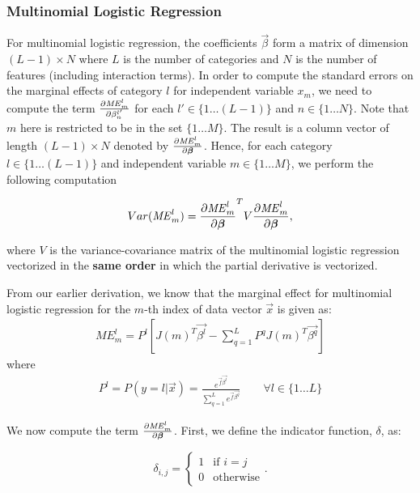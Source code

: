 \subsubsection*{Multinomial Logistic Regression}

For multinomial logistic regression, the coefficients $\vec{\beta}$ form a matrix of
dimension $(L-1) \times N$ where $L$ is the number of categories and $N$ is the
number of features (including interaction terms). In order to compute the
standard errors on the marginal effects of category $l$ for independent variable
$x_m$, we need to compute the term $\pder[\mathit{ME}_{m}^{l}]{\beta_{n}^{l'}}$
for each $l' \in \{1 \ldots (L-1) \}$ and $n \in \{1 \ldots N \}$. Note that
$m$ here is restricted to be in the set $\{1 \ldots M\}$.
The result is a column vector of length $(L-1) \times N$ denoted by
$\pder[\mathit{ME}_{m}^{l}]{\vec{\beta}}$. Hence, for each category
$l \in \{1 \ldots (L-1)\}$ and independent variable $m \in \{1 \ldots M\}$, we
perform the following computation

\begin{equation}
 Var(\mathit{ME}_m^l) = \pder[\mathit{ME}_m^l]{\vec{\beta}}^T V \pder[\mathit{ME}_m^l]{\vec{\beta}},
\end{equation}

where $V$ is the variance-covariance matrix of the multinomial logistic
regression vectorized in the \textbf{same order} in which the partial derivative
is vectorized.

From our earlier derivation, we know that the marginal effect for multinomial
logistic regression for the $m$-th index of data vector $\vec{x}$ is given as:
\begin{gather*}
  \mathit{ME}_m^l = P^l \left[ J(m)^T \vec{\beta^l} -
                             \sum_{q=1}^{L} P^q J(m)^T \vec{\beta^q} \right]
\end{gather*}
where
\begin{gather*}
  P^l = P(y=l| \vec{x}) = \frac{e^{\vec{f}\vec{\beta^l}}}{\displaystyle \sum_{q=1}^{L} e^{\vec{f}\vec{\beta^q}}}
    \qquad \forall l \in \{ 1 \ldots L \}
\end{gather*}

We now compute the term $\pder[\mathit{ME}_m^l]{\vec{\beta}}$. First,
we define the indicator function, $\delta$, as:

\begin{equation*}
\delta_{i,j} = \begin{cases} 1 & \mbox{if } i=j \\
                          0 & \mbox{otherwise} \end{cases}.
\end{equation*}

